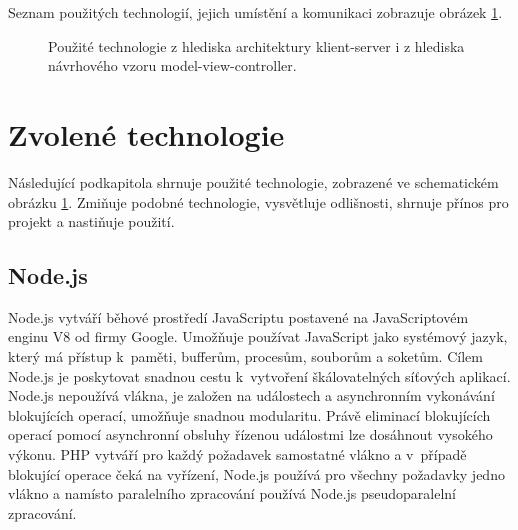 Seznam použitých technologií, jejich umístění a komunikaci zobrazuje obrázek \ref{img:server-architektura}.
\begin{figure}[h]
	\centering
	\caption{Použité technologie z hlediska architektury klient-server i z hlediska návrhového vzoru model-view-controller.}\label{img:server-architektura}
\end{figure}

\section{Zvolené technologie}
Následující podkapitola shrnuje použité technologie, zobrazené ve schematickém obrázku \ref{img:server-architektura}. Zmiňuje podobné technologie, vysvětluje odlišnosti, shrnuje přínos pro projekt a nastiňuje použití.

\subsection{Node.js}
Node.js vytváří běhové prostředí JavaScriptu postavené na JavaScriptovém enginu V8 od firmy Google. Umožňuje používat JavaScript jako systémový jazyk, který má přístup k~paměti, bufferům, procesům, souborům a soketům. Cílem Node.js je poskytovat snadnou cestu k~vytvoření škálovatelných síťových aplikací. Node.js nepoužívá vlákna, je založen na událostech a asynchronním vykonávání blokujících operací, umožňuje snadnou modularitu. Právě eliminací blokujících operací pomocí asynchronní obsluhy řízenou událostmi lze dosáhnout vysokého výkonu. PHP vytváří pro každý požadavek samostatné vlákno a v~případě blokující operace čeká na vyřízení, Node.js používá pro všechny požadavky jedno vlákno a namísto paralelního zpracování používá Node.js pseudoparalelní zpracování.


